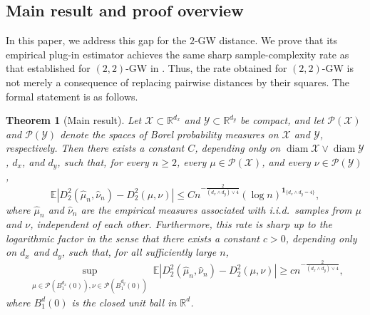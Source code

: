 \documentclass[11pt]{amsart}
\newtheorem{theorem}{Theorem}[section]
\theoremstyle{definition}
\theoremstyle{remark}
\newcommand{\R}{\mathbb{R}}
\newcommand{\E}{\mathbb{E}}
\newcommand{\1}{\mathbf{1}}
\newcommand{\diam}{\operatorname{diam}}
\numberwithin{equation}{section}
\begin{document}
\subsection{Main result and proof overview} 
In this paper, we address this gap for the $2$-GW distance. We prove that its empirical plug-in estimator achieves the same
sharp sample-complexity rate as that established for $(2,2)$-GW in
\cite{zhang2024gromov}. Thus, the rate obtained for $(2,2)$-GW
is not merely a consequence of replacing pairwise distances by their squares.
The formal statement is as follows.

\begin{theorem}[Main result]
\label{thm:main-informal}
Let $\mathcal X\subset\R^{d_x}$ and $\mathcal Y\subset\R^{d_y}$ be
compact, and let $\mathcal P(\mathcal X)$ and $\mathcal P(\mathcal Y)$ denote the spaces of Borel probability measures on $\mathcal X$ and $\mathcal Y$, respectively. Then there exists a constant $C$, depending only on
$\diam\mathcal X\vee\diam\mathcal Y$, $d_x$, and $d_y$, such that, for
every $n\geq2$, every $\mu\in\mathcal P(\mathcal X)$, and every
$\nu\in\mathcal P(\mathcal Y)$,
\begin{equation}
\label{eq:upper-bound}
\E\left|
D_2^2(\widehat\mu_n,\widehat\nu_n)-D_2^2(\mu,\nu)
\right|
\leq
C n^{-\frac{2}{(d_x\wedge d_y)\vee4}}
(\log n)^{\mathbf 1_{\{d_x\wedge d_y=4\}}},
\end{equation}
where $\widehat\mu_n$ and $\widehat\nu_n$ are the empirical measures
associated with i.i.d.\ samples from $\mu$ and
$\nu$, independent of each other.
Furthermore, this rate is sharp up to the logarithmic factor in the sense that there exists a constant $c>0$, depending only on
$d_x$ and $d_y$, such that, for all sufficiently large $n$,
\begin{equation}
\label{eq:lower-bound}
\sup_{\substack{
\mu\in\mathcal P(B_1^{d_x}(0)),
\nu\in\mathcal P(B_1^{d_y}(0))
}}
\E\left|
D_2^2(\widehat\mu_n,\widehat\nu_n)-D_2^2(\mu,\nu)
\right|
\geq
c n^{-\frac{2}{(d_x\wedge d_y)\vee4}},
\end{equation}
where
$B_1^d(0)$ is the closed unit ball in $\R^d$.
\end{theorem}
\end{document}
